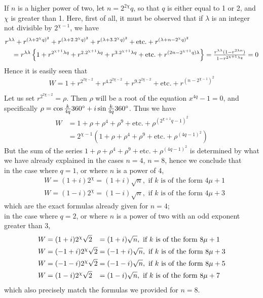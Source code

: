 \documentclass[twoside,12pt]{memoir}
\let\oldfrac\frac
\def\frac#1#2{\mathchoice{\tfrac{#1}{#2}}{\oldfrac{#1}{#2}}{\genfrac{}{}{}{2}{#1}{#2\mathstrut}}{\genfrac{}{}{}{3}{#1}{#2\mathstrut}}}
\begin{document}
If \(n\) is a higher power of two, let \(n=2^{2 \chi} q\), so that \(q\) is either equal to 1 or 2, and \(\chi\) is greater than 1. Here, first of all, it must be observed that if \(\lambda\) is an integer not divisible by \(2^{\chi-1}\), we have
\[\begin{aligned}
& r^{\lambda \lambda}+r^{(\lambda+2^{\chi} q)^{2}}+r^{(\lambda+2.2^{\chi} q)^{2}}+r^{(\lambda+3.2^{\chi} q)^{2}}+\text{etc{.}}+r^{(\lambda+n-2^{\chi} q)^{2}} \\
& \quad=r^{\lambda \lambda}\left\{1+r^{2^{\chi+1} \lambda q}+r^{2.2^{\chi+1} \lambda q}+r^{3.2^{\chi+1} \lambda q}+\text{etc{.}}+r^{(2 n-2^{\chi+1} q) \lambda}\right\}=\frac{r^{\lambda \lambda}(1-r^{2 \lambda n})}{1-r^{2^{\chi+1} \lambda q}}=0
\end{aligned}\]
Hence it is easily seen that
\[W=1+r^{2^{2 \chi-2}}+r^{4.2^{2 \chi-2}}+r^{9.2^{2 \chi-2}}+\text{etc{.}}+r^{(n-2^{\chi-1})^{2}}\]\pagebreak%

Let us set \(r^{2^{2 \chi-2}}=\rho\). Then \(\rho\) will be a root of the equation \(x^{4 q}-1=0\), and specifically \(\rho=\cos \frac{k}{4 q} 360^{\circ}+i \sin \frac{k}{4 q} 360^{\circ}\). Thus we have
\[\begin{aligned}
W & =1+\rho+\rho^{4}+\rho^{9}+\text{etc{.}}+\rho^{(2^{\chi+1} q-1)^{2}} \\
& =2^{\chi-1}(1+\rho+\rho^{4}+\rho^{9}+\text{etc{.}}+\rho^{(4 q-1)^{2}})
\end{aligned}\]
But the sum of the series \(1+\rho+\rho^{4}+\rho^{9}+\text{etc{.}}+\rho^{(4 q-1)^{2}}\) is determined by what we have already explained in the cases \(n=4\), \(n=8\), hence we conclude that\\
in the case where \(q=1\), or where \(n\) is a power of 4,
\[\begin{aligned}
& W=(1+i) 2^{\chi}=(1+i) \sqrt n, \text{ if } k \text{ is of the form } 4 \mu+1 \\
& W=(1-i) 2^{\chi}=(1-i) \sqrt n, \text{ if } k \text{ is of the form } 4 \mu+3
\end{aligned}\]
which are the exact formulas already given for \(n=4\);\\
in the case where \(q=2\), or where \(n\) is a power of two with an odd exponent greater than 3,
\[\begin{alignedat}[t]{2}
W&=(1+i) 2^{\chi} \sqrt 2&&=(1+i) \sqrt n, \text{ if } k \text{ is of the form } 8 \mu+1 \\
W&=(-1+i) 2^{\chi} \sqrt 2&&=(-1+i) \sqrt n, \text{ if } k \text{ is of the form } 8 \mu+3 \\
W&=(-1-i) 2^{\chi} \sqrt 2&&=(-1-i) \sqrt n, \text{ if } k \text{ is of the form } 8 \mu+5 \\
W&=(1-i) 2^{\chi} \sqrt 2&&=(1-i) \sqrt n, \text{ if } k \text{ is of the form } 8 \mu+7
\end{alignedat}\]
which also precisely match the formulas we provided for \(n=8\).
\end{document}
